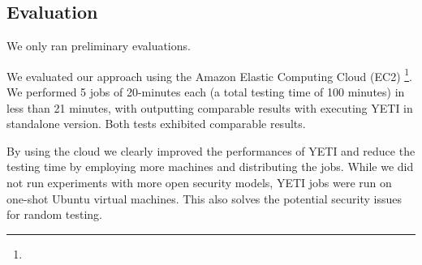\subsection{Evaluation}

We only ran preliminary evaluations.

We evaluated our approach using the Amazon Elastic Computing Cloud (EC2) \footnote{}.
We performed 5 jobs of 20-minutes each (a total testing time of 100 minutes) in less 
than 21 minutes, with outputting comparable results with executing YETI in standalone version.
Both tests exhibited comparable results.

By using the cloud we clearly improved the performances of YETI and reduce the testing time by 
employing more machines and distributing the jobs.
While we did not run experiments with more open security models, 
YETI jobs were run on one-shot Ubuntu virtual machines. This also solves
the potential security issues for random testing.
